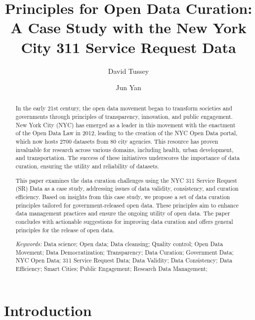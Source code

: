 \documentclass[12pt, titlepage]{article}
\title{Principles for Open Data Curation: A Case Study with the New
  York City 311 Service Request Data}
\author[1]{David Tussey}
\author[2]{Jun Yan}
\affil[1]{Former Executive Director, NYC DoITT}
\affil[2]{Department of Statistics, University of Connecticut}
\begin{document}
\maketitle

\tableofcontents %
\listoffigures %
\listoftables %



\begin{abstract}
  In the early 21st century, the open data movement began to transform societies and governments through principles of transparency, 
  innovation, and public engagement. New York City (NYC) has emerged as a leader in this movement 
  with the enactment of the Open Data Law in 2012, leading to the creation of the NYC Open Data portal, 
  which now hosts 2700 datasets from 80 city agencies. This resource has proven invaluable for research 
  across various domains, including health, urban development, and transportation. 
  The success of these initiatives underscores the importance of data curation, ensuring the utility and reliability of datasets. 

This paper examines the data curation challenges using the NYC 311 Service Request (SR) Data as a case study, 
  addressing issues of data validity, consistency, and curation efficiency. Based on insights from this case study, 
  we propose a set of data curation principles tailored for government-released open data. 
  These principles aim to enhance data management practices and ensure the ongoing utility of open data. 
  The paper concludes with actionable suggestions for improving data curation 
  and offers general principles for the release of open data.


\bigskip
  
\noindent
{\it Keywords:}
Data science;
Open data;
Data cleansing;
Quality control;
Open Data Movement;
Data Democratization;
Transparency;
Data Curation;
Government Data;
NYC Open Data;
311 Service Request Data;
Data Validity;
Data Consistency;
Data Efficiency;
Smart Cities;
Public Engagement;
Research Data Management;

\end{abstract}

\doublespacing

\section{Introduction} \label{sec:intro}
\end{document}

